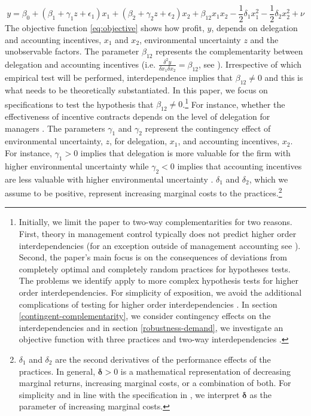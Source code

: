 \documentclass[12pt]{article}
\begin{document}
\begin{equation}\label{eq:objective}
y  = \beta_0 + (\beta_{1} + \gamma_1 z + \epsilon_1) x_1 
						+ (\beta_{2} + \gamma_2 z  + \epsilon_2) x_2 
                        + \beta_{12} x_1 x_2 - \frac{1}{2}\delta_1 x^2_1 - \frac{1}{2}\delta_2 x^2_2 + \nu
\end{equation}
The objective function \eqref{eq:objective} shows how profit, $y$, depends on delegation and accounting incentives, $x_1$ and $x_2$, environmental uncertainty $z$ and the unobservable factors. The parameter $\beta_{12}$ represents the complementarity between delegation and accounting incentives (i.e. $\frac{\delta^2 y}{\delta x_1 \delta x_2} = \beta_{12}$, see \citet{grabner_management_2013}). Irrespective of which empirical test will be performed, interdependence implies that $\beta_{12}\neq0$ and this is what needs to be theoretically substantiated. In this paper, we focus on specifications to test the hypothesis that $\beta_{12} \neq 0$.\footnote{Initially, we limit the paper to two-way complementarities for two reasons. First, theory in management control typically does not predict higher order interdependencies (for an exception outside of management accounting see \citet{aral_three-way_2012}). Second, the paper's main focus is on the consequences of deviations from completely optimal and completely random practices for hypotheses tests. The problems we identify apply to more complex hypothesis tests for higher order interdependencies. For simplicity of exposition, we avoid the additional complications of testing for higher order interdependencies \citep{carree_note_2011}. In section \ref{contingent-complementarity}, we consider contingency effects on the interdependencies \citep{grabner_incentive_2014, grabner_cost_2016, matejka_balancing_2017} and in section \ref{robustness-demand}, we investigate an objective function with three practices and two-way interdependencies \citep{indjejikian_accounting_2012}.}
For instance, whether the effectiveness of incentive contracts depends on the level of delegation for managers \citep{moers_performance_2006, indjejikian_accounting_2012}. The parameters $\gamma_1$ and $\gamma_2$ represent the contingency effect of environmental uncertainty, $z$, for delegation, $x_1$, and accounting incentives, $x_2$. For instance, $\gamma_1 > 0$ implies that delegation is more valuable for the firm with higher environmental uncertainty while $\gamma_2 < 0$ implies that accounting incentives are less valuable with higher environmental uncertainty \citep{chenhall_management_2003}. 
$\delta_1$ and $\delta_2$, which we assume to be positive, represent increasing marginal costs to the practices.\footnote{$\delta_{1}$ and $\delta_{2}$ are the second derivatives of the performance effects of the practices. In general, $\mathbf{\delta} > 0$ is a mathematical representation of decreasing marginal returns,  increasing marginal  costs, or a combination of both. For simplicity and in line with the specification in \citet{grabner_management_2013}, we interpret $\mathbf{\delta}$ as the parameter of  increasing marginal costs.} 
\end{document}
